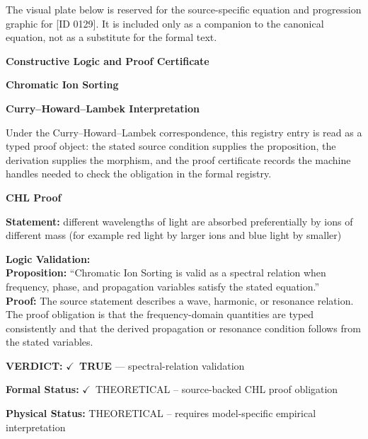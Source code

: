 \begingroup\footnotesize\sloppy
The visual plate below is reserved for the source-specific equation and progression graphic for [ID 0129]. It is included only as a companion to the canonical equation, not as a substitute for the formal text.
\par\endgroup
\ifTZPDarkEdition
{}
\fi

\clearpage
\begingroup\tzpsupportsetup
\noindent\textbf{\fontsize{10.8pt}{12.8pt}\selectfont [ID 0129] Constructive Logic and Proof Certificate}\par
\noindent\textbf{\fontsize{10pt}{12pt}\selectfont Chromatic Ion Sorting}\par
\vspace{0.45em}
\begingroup
\footnotesize
\setlength{\parskip}{0.22em}
\setlength{\parindent}{0pt}
\noindent\textbf{Curry--Howard--Lambek Interpretation}\par
Under the Curry--Howard--Lambek correspondence, this registry entry is read as a typed proof
object: the stated source condition supplies the proposition, the derivation supplies the
morphism, and the proof certificate records the machine handles needed to check the obligation
in the formal registry.

\vspace{0.45em}
\noindent\textbf{CHL Proof}\par
\textbf{Statement:} different wavelengths of light are absorbed preferentially by ions of different mass
(for example red light by larger ions and blue light by smaller)

\textbf{Logic Validation:}\\
\textbf{Proposition:} ``Chromatic Ion Sorting is valid as a spectral relation when frequency, phase, and
propagation variables satisfy the stated equation.''\\
\textbf{Proof:} The source statement describes a wave, harmonic, or resonance relation. The proof
obligation is that the frequency-domain quantities are typed consistently and that the
derived propagation or resonance condition follows from the stated variables.

\textbf{VERDICT:} \ensuremath{\checkmark}\ \textbf{TRUE} --- spectral-relation validation

\textbf{Formal Status:} \ensuremath{\checkmark}\ THEORETICAL -- source-backed CHL proof obligation

\textbf{Physical Status:} THEORETICAL -- requires model-specific empirical interpretation
\par\vspace{0.45em}
\par
\ifTZPDarkEdition
{}
\fi
\endgroup
\endgroup
